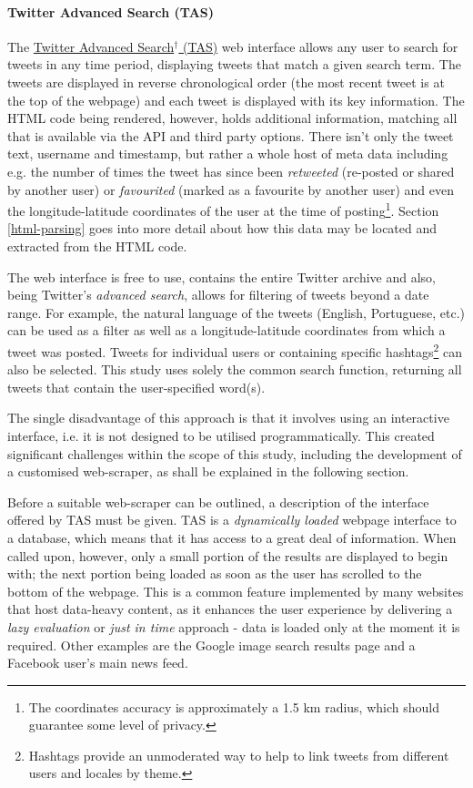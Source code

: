 \documentclass{article}
\begin{document}
\paragraph{Twitter Advanced Search (TAS) \label{TAS}}
\label{sec-3-2-3-3}

The \href{https://twitter.com/search-advanced?lang\%3Den}{Twitter Advanced Search$^{\dag{}}$ (TAS)} web interface allows any user to search for tweets in any time period, displaying tweets that match a given search term. The tweets are displayed in reverse chronological order (the most recent tweet is at the top of the webpage) and each tweet is displayed with its key information. The HTML code being rendered, however, holds additional information, matching all that is available via the API and third party options. There isn't only the tweet text, username and timestamp, but rather a whole host of meta data including e.g. the number of times the tweet has since been \emph{retweeted} (re-posted or shared by another user) or \emph{favourited} (marked as a favourite by another user) and even the longitude-latitude coordinates of the user at the time of posting\footnote{The coordinates accuracy is approximately a 1.5 km radius, which should guarantee some level of privacy.}. Section \ref{html-parsing} goes into more detail about how this data may be located and extracted from the HTML code.

The web interface is free to use, contains the entire Twitter archive and also, being Twitter's \emph{advanced search}, allows for filtering of tweets beyond a date range. For example, the natural language of the tweets (English, Portuguese, etc.) can be used as a filter as well as a longitude-latitude coordinates from which a tweet was posted. Tweets for individual users or containing specific hashtags\footnote{Hashtags provide an unmoderated way to help to link tweets from different users and locales by theme.} can also be selected. This study uses solely the common search function, returning all tweets that contain the user-specified word(s).

The single disadvantage of this approach is that it involves using an interactive interface, i.e. it is not designed to be utilised programmatically. This created significant challenges within the scope of this study, including the development of a customised web-scraper, as shall be explained in the following section.

Before a suitable web-scraper can be outlined, a description of the interface offered by TAS must be given. TAS is a \emph{dynamically loaded} webpage interface to a database, which means that it has access to a great deal of information. When called upon, however, only a small portion of the results are displayed to begin with; the next portion being loaded as soon as the user has scrolled to the bottom of the webpage. This is a common feature implemented by many websites that host data-heavy content, as it enhances the user experience by delivering a \emph{lazy evaluation} or \emph{just in time} approach - data is loaded only at the moment it is required. Other examples are the Google image search results page and a Facebook user's main news feed.
\end{document}
